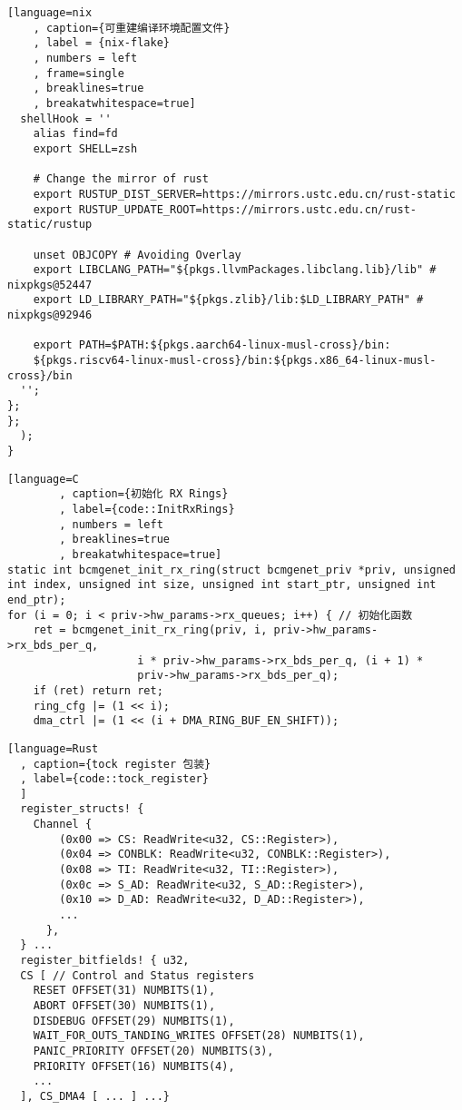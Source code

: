 \begin{lstlisting}[language=nix
    , caption={可重建编译环境配置文件}
    , label = {nix-flake}
    , numbers = left
    , frame=single
    , breaklines=true
    , breakatwhitespace=true]
  shellHook = ''
    alias find=fd
    export SHELL=zsh

    # Change the mirror of rust
    export RUSTUP_DIST_SERVER=https://mirrors.ustc.edu.cn/rust-static
    export RUSTUP_UPDATE_ROOT=https://mirrors.ustc.edu.cn/rust-static/rustup

    unset OBJCOPY # Avoiding Overlay
    export LIBCLANG_PATH="${pkgs.llvmPackages.libclang.lib}/lib" # nixpkgs@52447
    export LD_LIBRARY_PATH="${pkgs.zlib}/lib:$LD_LIBRARY_PATH" # nixpkgs@92946
  
    export PATH=$PATH:${pkgs.aarch64-linux-musl-cross}/bin:
    ${pkgs.riscv64-linux-musl-cross}/bin:${pkgs.x86_64-linux-musl-cross}/bin
  '';
};
};
  );
}      
\end{lstlisting}

\begin{lstlisting}[language=C
        , caption={初始化 RX Rings}
        , label={code::InitRxRings}
        , numbers = left
        , breaklines=true
        , breakatwhitespace=true]
static int bcmgenet_init_rx_ring(struct bcmgenet_priv *priv, unsigned int index, unsigned int size, unsigned int start_ptr, unsigned int end_ptr);
for (i = 0; i < priv->hw_params->rx_queues; i++) { // 初始化函数
    ret = bcmgenet_init_rx_ring(priv, i, priv->hw_params->rx_bds_per_q,
                    i * priv->hw_params->rx_bds_per_q, (i + 1) *
                    priv->hw_params->rx_bds_per_q);
    if (ret) return ret;
    ring_cfg |= (1 << i);
    dma_ctrl |= (1 << (i + DMA_RING_BUF_EN_SHIFT));
\end{lstlisting}

\begin{lstlisting}[language=Rust
  , caption={tock register 包装}
  , label={code::tock_register}
  ]
  register_structs! {
    Channel {
        (0x00 => CS: ReadWrite<u32, CS::Register>),
        (0x04 => CONBLK: ReadWrite<u32, CONBLK::Register>),
        (0x08 => TI: ReadWrite<u32, TI::Register>),
        (0x0c => S_AD: ReadWrite<u32, S_AD::Register>),
        (0x10 => D_AD: ReadWrite<u32, D_AD::Register>),
        ...
      },
  } ...
  register_bitfields! { u32,
  CS [ // Control and Status registers
    RESET OFFSET(31) NUMBITS(1),
    ABORT OFFSET(30) NUMBITS(1),
    DISDEBUG OFFSET(29) NUMBITS(1),
    WAIT_FOR_OUTS_TANDING_WRITES OFFSET(28) NUMBITS(1),
    PANIC_PRIORITY OFFSET(20) NUMBITS(3),
    PRIORITY OFFSET(16) NUMBITS(4),
    ...
  ], CS_DMA4 [ ... ] ...}
\end{lstlisting}
